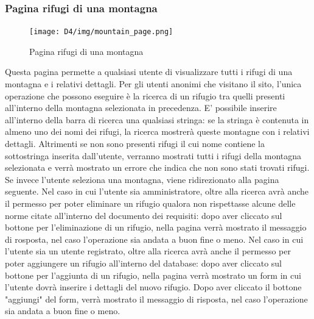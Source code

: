 \documentclass[a4paper,12pt]{article}
\begin{document}
\subsubsection{Pagina rifugi di una montagna}
\begin{figure}[H]
    \centering
    \texttt{[image: D4/img/mountain\_page.png]}
    \caption{Pagina rifugi di una montagna}
\end{figure}
Questa pagina permette a qualsiasi utente di visualizzare tutti i rifugi di una montagna e i relativi dettagli.\newline
Per gli utenti anonimi che visitano il sito, l'unica operazione che possono eseguire è la ricerca di un rifugio tra quelli presenti all'interno della montagna selezionata in precedenza. \newline
E' possibile inserire all'interno della barra di ricerca una qualsiasi stringa: se la stringa è contenuta in almeno uno dei nomi dei rifugi, la ricerca mostrerà queste montagne con i relativi dettagli. \newline
Altrimenti se non sono presenti rifugi il cui nome contiene la sottostringa inserita dall'utente, verranno mostrati tutti i rifugi della montagna selezionata e verrà mostrato un errore che indica che non sono stati trovati rifugi. \newline
Se invece l'utente seleziona una montagna, viene ridirezionato alla pagina seguente. \newline
Nel caso in cui l'utente sia amministratore, oltre alla ricerca avrà anche il permesso per poter eliminare un rifugio qualora non rispettasse alcune delle norme citate all'interno del documento dei requisiti: dopo aver cliccato sul bottone per l'eliminazione di un rifugio, nella pagina verrà mostrato il messaggio di rosposta, nel caso l'operazione sia andata a buon fine o meno. \newline
Nel caso in cui l'utente sia un utente registrato, oltre alla ricerca avrà anche il permesso per poter aggiungere un rifugio all'interno del database: dopo aver cliccato sul bottone per l'aggiunta di un rifugio, nella pagina verrà mostrato un form in cui l'utente dovrà inserire i dettagli del nuovo rifugio. \newline
Dopo  aver cliccato il bottone "aggiungi" del form, verrà mostrato il messaggio di risposta, nel caso l'operazione sia andata a buon fine o meno.
\end{document}
